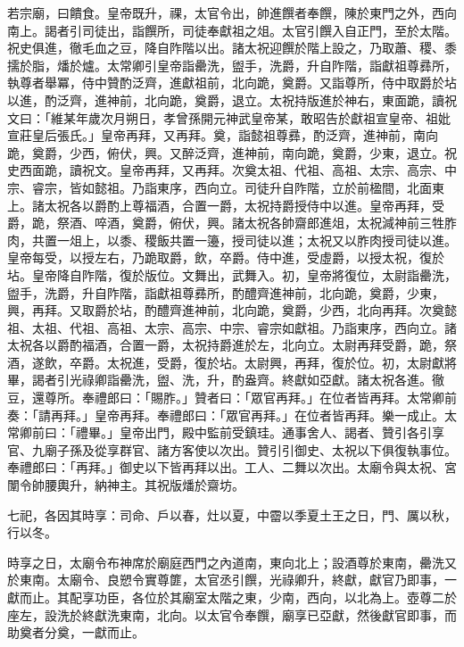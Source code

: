 \begin{pinyinscope}
 若宗廟，曰饋食。皇帝既升，祼，太官令出，帥進饌者奉饌，陳於東門之外，西向南上。謁者引司徒出，詣饌所，司徒奉獻祖之俎。太官引饌入自正門，至於太階。祝史俱進，徹毛血之豆，降自阼階以出。諸太祝迎饌於階上設之，乃取蕭、稷、黍擩於脂，燔於爐。太常卿引皇帝詣罍洗，盥手，洗爵，升自阼階，詣獻祖尊彞所，執尊者舉冪，侍中贊酌泛齊，進獻祖前，北向跪，奠爵。又詣尊所，侍中取爵於坫以進，酌泛齊，進神前，北向跪，奠爵，退立。太祝持版進於神右，東面跪，讀祝文曰：「維某年歲次月朔日，孝曾孫開元神武皇帝某，敢昭告於獻祖宣皇帝、祖妣宣莊皇后張氏。」皇帝再拜，又再拜。奠，詣懿祖尊彞，酌泛齊，進神前，南向跪，奠爵，少西，俯伏，興。又醉泛齊，進神前，南向跪，奠爵，少東，退立。祝史西面跪，讀祝文。皇帝再拜，又再拜。次奠太祖、代祖、高祖、太宗、高宗、中宗、睿宗，皆如懿祖。乃詣東序，西向立。司徒升自阼階，立於前楹間，北面東上。諸太祝各以爵酌上尊福酒，合置一爵，太祝持爵授侍中以進。皇帝再拜，受爵，跪，祭酒、啐酒，奠爵，俯伏，興。諸太祝各帥齋郎進俎，太祝減神前三牲胙肉，共置一俎上，以黍、稷飯共置一籩，授司徒以進；太祝又以胙肉授司徒以進。皇帝每受，以授左右，乃跪取爵，飲，卒爵。侍中進，受虛爵，以授太祝，復於坫。皇帝降自阼階，復於版位。文舞出，武舞入。初，皇帝將復位，太尉詣罍洗，盥手，洗爵，升自阼階，詣獻祖尊彞所，酌醴齊進神前，北向跪，奠爵，少東，興，再拜。又取爵於坫，酌醴齊進神前，北向跪，奠爵，少西，北向再拜。次奠懿祖、太祖、代祖、高祖、太宗、高宗、中宗、睿宗如獻祖。乃詣東序，西向立。諸太祝各以爵酌福酒，合置一爵，太祝持爵進於左，北向立。太尉再拜受爵，跪，祭酒，遂飲，卒爵。太祝進，受爵，復於坫。太尉興，再拜，復於位。初，太尉獻將畢，謁者引光祿卿詣罍洗，盥、洗，升，酌盎齊。終獻如亞獻。諸太祝各進。徹豆，還尊所。奉禮郎曰：「賜胙。」贊者曰：「眾官再拜。」在位者皆再拜。太常卿前奏：「請再拜。」皇帝再拜。奉禮郎曰：「眾官再拜。」在位者皆再拜。樂一成止。太常卿前曰：「禮畢。」皇帝出門，殿中監前受鎮珪。通事舍人、謁者、贊引各引享官、九廟子孫及從享群官、諸方客使以次出。贊引引御史、太祝以下俱復執事位。奉禮郎曰：「再拜。」御史以下皆再拜以出。工人、二舞以次出。太廟令與太祝、宮闈令帥腰輿升，納神主。其祝版燔於齋坊。



 七祀，各因其時享：司命、戶以春，灶以夏，中霤以季夏土王之日，門、厲以秋，行以冬。



 時享之日，太廟令布神席於廟庭西門之內道南，東向北上；設酒尊於東南，罍洗又於東南。太廟令、良愬令實尊篚，太官丞引饌，光祿卿升，終獻，獻官乃即事，一獻而止。其配享功臣，各位於其廟室太階之東，少南，西向，以北為上。壺尊二於座左，設洗於終獻洗東南，北向。以太官令奉饌，廟享已亞獻，然後獻官即事，而助奠者分奠，一獻而止。




\end{pinyinscope}
